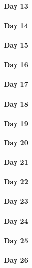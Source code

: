 \documentclass[UTF8,a4paper,8pt]{ctexart}
\begin{document}
 	 \paragraph{Day 13      \quad     }
 	 \paragraph{Day 14      \quad     }
 	 \paragraph{Day 15      \quad     }
 	 \paragraph{Day 16      \quad     }
 	 \paragraph{Day 17      \quad     }
 	 \paragraph{Day 18      \quad     }
 	 \paragraph{Day 19      \quad     }
 	 \paragraph{Day 20      \quad     }
 	 \paragraph{Day 21      \quad     }
 	 \paragraph{Day 22      \quad     }
 	 \paragraph{Day 23      \quad     }
 	 \paragraph{Day 24      \quad     }
 	 \paragraph{Day 25      \quad     }
 	 \paragraph{Day 26      \quad     }
\end{document}
